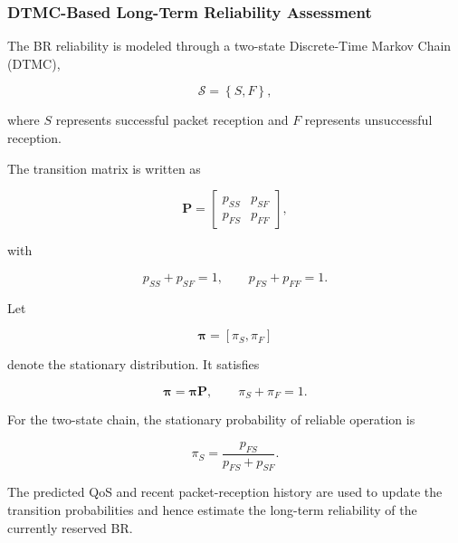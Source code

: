 \subsubsection{DTMC-Based Long-Term Reliability Assessment}

The BR reliability is modeled through a two-state Discrete-Time Markov
Chain (DTMC),

\begin{equation}
\mathcal{S}
=
\left\{
S,F
\right\},
\label{eq:ris_dtmc_states}
\end{equation}

where $S$ represents successful packet reception and $F$ represents
unsuccessful reception.

The transition matrix is written as

\begin{equation}
\mathbf{P}
=
\begin{bmatrix}
p_{SS} & p_{SF}
\\
p_{FS} & p_{FF}
\end{bmatrix},
\label{eq:ris_dtmc_matrix}
\end{equation}

with

\begin{equation}
p_{SS}+p_{SF}=1,
\qquad
p_{FS}+p_{FF}=1.
\label{eq:ris_dtmc_row_sum}
\end{equation}

Let

\begin{equation}
\boldsymbol{\pi}
=
\left[
\pi_S,
\pi_F
\right]
\end{equation}

denote the stationary distribution. It satisfies

\begin{equation}
\boldsymbol{\pi}
=
\boldsymbol{\pi}\mathbf{P},
\qquad
\pi_S+\pi_F=1.
\label{eq:ris_stationary_equations}
\end{equation}

For the two-state chain, the stationary probability of reliable operation is

\begin{equation}
\pi_S
=
\frac{
p_{FS}
}{
p_{FS}+p_{SF}
}.
\label{eq:ris_stationary_success}
\end{equation}

The predicted QoS and recent packet-reception history are used to update
the transition probabilities and hence estimate the long-term reliability
of the currently reserved BR.

